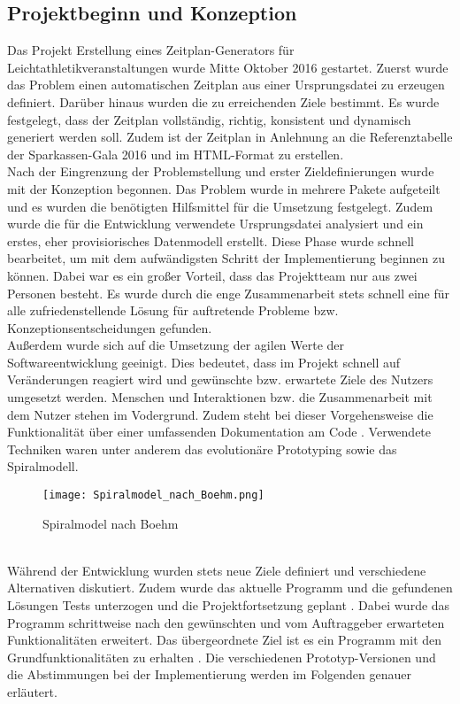 \subsection{Projektbeginn und Konzeption}
Das Projekt Erstellung eines Zeitplan-Generators für Leichtathletikveranstaltungen wurde Mitte Oktober 2016 gestartet. Zuerst wurde das Problem einen automatischen Zeitplan aus einer Ursprungsdatei zu erzeugen definiert. Darüber hinaus wurden die zu erreichenden Ziele bestimmt. Es wurde festgelegt, dass der Zeitplan vollständig, richtig, konsistent und dynamisch generiert werden soll. Zudem ist der Zeitplan in Anlehnung an die Referenztabelle der Sparkassen-Gala 2016 und im HTML-Format zu erstellen.\\
Nach der Eingrenzung der Problemstellung und erster Zieldefinierungen wurde mit der Konzeption begonnen. Das Problem wurde in mehrere Pakete aufgeteilt und es wurden die benötigten Hilfsmittel für die Umsetzung festgelegt. Zudem wurde die für die Entwicklung verwendete Ursprungsdatei analysiert und ein erstes, eher provisiorisches Datenmodell erstellt.
Diese Phase wurde schnell bearbeitet, um mit dem aufwändigsten Schritt der Implementierung beginnen zu können. Dabei war es ein großer Vorteil, dass das Projektteam nur aus zwei Personen besteht. Es wurde durch die enge Zusammenarbeit stets schnell eine für alle zufriedenstellende Lösung für auftretende Probleme bzw. Konzeptionsentscheidungen gefunden.\\
Außerdem wurde sich auf die Umsetzung der agilen Werte der Softwareentwicklung geeinigt. Dies bedeutet, dass im Projekt schnell auf Veränderungen reagiert wird und gewünschte bzw. erwartete Ziele des Nutzers umgesetzt werden. Menschen und Interaktionen bzw. die Zusammenarbeit mit dem Nutzer stehen im Vodergrund. Zudem steht bei dieser Vorgehensweise die Funktionalität über einer umfassenden Dokumentation am Code \cite{agilewerte}. Verwendete Techniken waren unter anderem das evolutionäre Prototyping sowie das Spiralmodell.
\begin{figure}[htbp]
  \centering
  \texttt{[image: Spiralmodel\_nach\_Boehm.png]}
  \caption{Spiralmodel nach Boehm}
  \label{fig:Fig1}
\end{figure}\\
Während der Entwicklung wurden stets neue Ziele definiert und verschiedene Alternativen diskutiert. Zudem wurde das aktuelle Programm und die gefundenen Lösungen Tests unterzogen und die Projektfortsetzung geplant \cite{spiralmodell}. Dabei wurde das Programm schrittweise nach den gewünschten und vom Auftraggeber erwarteten Funktionalitäten erweitert. Das übergeordnete Ziel ist es ein Programm mit den Grundfunktionalitäten zu erhalten \cite{prototyping}. Die verschiedenen Prototyp-Versionen und die Abstimmungen bei der Implementierung werden im Folgenden genauer erläutert.

